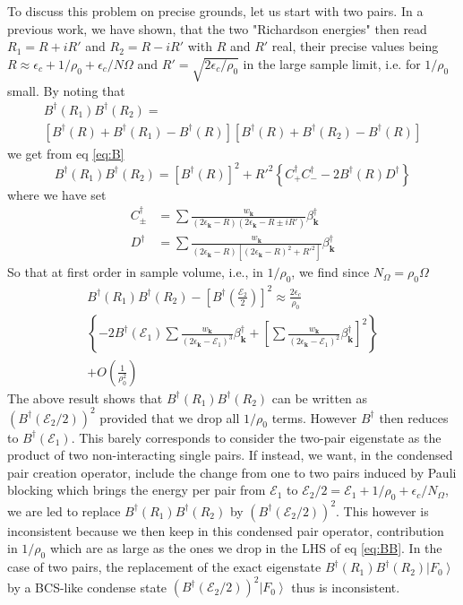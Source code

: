 \documentclass[aps,prb,amsmath,amssymb,superscriptaddress,twocolumn]{revtex4-1}
\newcommand{\vk}{\ensuremath{\mathbf{k}}}
\newcommand{\E}{\ensuremath{\mathbf{E}}}
\newcommand{\ket}[1]{\ensuremath{\left|#1\right>}}
\newcommand{\nth}[1]{\ensuremath{\frac{1}{#1}}}
\newcommand{\br}[1]{\ensuremath{\left(#1\right)}}
\newcommand{\mbr}[1]{\ensuremath{\left[#1\right]}}
\newcommand{\bbr}[1]{\ensuremath{\left\{#1\right\}}}
\newcommand{\fo}{\ensuremath{\ket{F_0}}}
\renewcommand{\E}{\ensuremath{\mathcal{E}}}
\begin{document}
To discuss this problem on precise grounds, let us start with two pairs.  In a previous work\cite{combescotBCS}, we have shown, that the two "Richardson energies" then read $R_1=R+iR'$ and $R_2=R-i{}R'$ with $R$ and $R'$ real, their precise values being $R\approx\epsilon_c+1/\rho_0+\epsilon_c/N\Omega$ and $R'=\sqrt{2\epsilon_c/\rho_0}$ in the large sample limit, i.e. for $1/\rho_0$ small.  By noting that
\begin{multline}
B^{\dagger}(R_1)B^{\dagger}(R_2)=\\
\mbr{B^{\dagger}(R)+B^{\dagger}(R_1)-B^{\dagger}(R)}\mbr{B^{\dagger}(R)+B^{\dagger}(R_2)-B^{\dagger}(R)}
\end{multline}
we get from eq \eqref{eq:B}
\begin{equation}
B^{\dagger}(R_1)B^{\dagger}(R_2)=\mbr{B^{\dagger}(R)}^2+R'^2\bbr{C^{\dagger}_+C^{\dagger}_--2B^{\dagger}(R)D^{\dagger}}
\end{equation}
where we have set 
\begin{align}
C^{\dagger}_{\pm}&=\sum\frac{w_\vk}{\br{2\epsilon_\vk-R}\br{2\epsilon_\vk-R\pm{}iR'}}\beta^{\dagger}_\vk\\
D^{\dagger}&=\sum\frac{w_\vk}{\br{2\epsilon_\vk-R}\mbr{\br{2\epsilon_\vk-R}^2+{}R'^2}}\beta^{\dagger}_\vk
\end{align}
So that at first order in sample volume, i.e., in $1/\rho_0$, we  find since $N_\Omega=\rho_0\Omega$
\begin{multline}\label{eq:BB}
B^{\dagger}(R_1)B^{\dagger}(R_2)-\mbr{B^{\dagger}(\frac{\E_2}{2})}^2\approx
\frac{2\epsilon_c}{\rho_0}\\\bbr{-2B^{\dagger}(\E_1)\sum\frac{w_\vk}{\br{2\epsilon_\vk-\E_1}^3}\beta^{\dagger}_\vk
+\mbr{\sum\frac{w_\vk}{\br{2\epsilon_\vk-\E_1}^2}\beta^{\dagger}_\vk}^2}\\+O(\nth{\rho_0^2})
\end{multline}
The above result shows that $B^{\dagger}(R_1)B^{\dagger}(R_2)$ can be written as $\br{B^{\dagger}(\E_2/2)}^2$ provided that we drop all $1/\rho_0$ terms.  However $B^{\dagger}$ then reduces to $B^{\dagger}(\E_1)$.  This barely corresponds to consider the two-pair eigenstate as the product of two non-interacting single pairs.  If instead, we want, in the condensed pair creation operator, include the change from one to two pairs induced by Pauli blocking which brings the energy per pair from $\E_1$ to $\E_2/2=\E_1+1/\rho_0+\epsilon_c/N_\Omega$, we are led to replace $B^{\dagger}(R_1)B^{\dagger}(R_2)$ by $\br{B^{\dagger}(\E_2/2)}^2$.  This however is inconsistent because we then keep in this condensed pair operator, contribution in $1/\rho_0$ which are as large as the ones we drop in the LHS of eq \eqref{eq:BB}.  In the case of two pairs, the replacement of the exact eigenstate  $B^{\dagger}(R_1)B^{\dagger}(R_2)\fo$ by a BCS-like condense state $\br{B^{\dagger}(\E_2/2)}^2\fo$ thus is inconsistent. 
\end{document}
